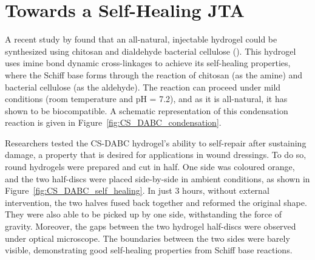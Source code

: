 \section{Towards a Self-Healing JTA}

A recent study by \citeauthor{liAllnaturalInjectableHydrogel2020} found that an all-natural, injectable hydrogel could be synthesized using chitosan and dialdehyde bacterial cellulose (\citeyear{liAllnaturalInjectableHydrogel2020}). This hydrogel uses imine bond dynamic cross-linkages to achieve its self-healing properties, where the Schiff base forms through the reaction of chitosan (as the amine) and bacterial cellulose (as the aldehyde).
The reaction can proceed under mild conditions (room temperature and pH = 7.2), and as it is all-natural, it has shown to be biocompatible. A schematic representation of this condensation reaction is given in Figure~\ref{fig:CS_DABC_condensation}.

Researchers tested the CS-DABC hydrogel's ability to self-repair after sustaining damage, a property that is desired for applications in wound dressings. To do so, round hydrogels were prepared and cut in half. One side was coloured orange, and the two half-discs were placed side-by-side in ambient conditions, as shown in Figure~\ref{fig:CS_DABC_self_healing}.
In just 3 hours, without external intervention, the two halves fused back together and reformed the original shape. They were also able to be picked up by one side, withstanding the force of gravity. Moreover, the gaps between the two hydrogel half-discs were observed under optical microscope.
The boundaries between the two sides were barely visible, demonstrating good self-healing properties from Schiff base reactions.

